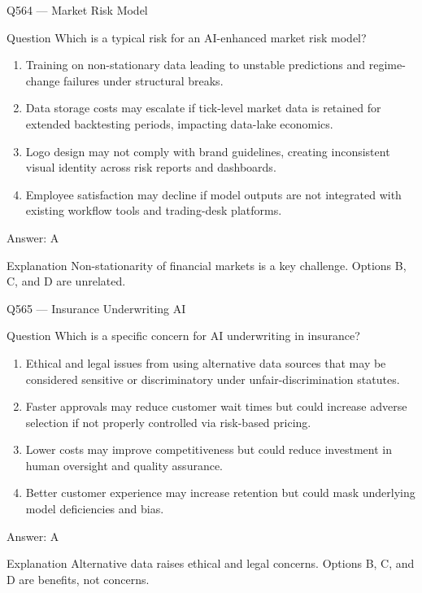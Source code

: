 \documentclass[aspectratio=169,8pt]{beamer}
\begin{document}
	\begin{frame}{Q564 --- Market Risk Model}
		\begin{block}{Question}
			Which is a typical risk for an AI-enhanced market risk model?
			\begin{enumerate}
				\item Training on non-stationary data leading to unstable predictions and regime-change failures under structural breaks.
				\item Data storage costs may escalate if tick-level market data is retained for extended backtesting periods, impacting data-lake economics.
				\item Logo design may not comply with brand guidelines, creating inconsistent visual identity across risk reports and dashboards.
				\item Employee satisfaction may decline if model outputs are not integrated with existing workflow tools and trading-desk platforms.
			\end{enumerate}
		\end{block}
		\begin{exampleblock}{Answer: A}\end{exampleblock}
		\begin{block}{Explanation}
			Non-stationarity of financial markets is a key challenge. Options B, C, and D are unrelated.
		\end{block}
	\end{frame}
	
	\begin{frame}{Q565 --- Insurance Underwriting AI}
		\begin{block}{Question}
			Which is a specific concern for AI underwriting in insurance?
			\begin{enumerate}
				\item Ethical and legal issues from using alternative data sources that may be considered sensitive or discriminatory under unfair-discrimination statutes.
				\item Faster approvals may reduce customer wait times but could increase adverse selection if not properly controlled via risk-based pricing.
				\item Lower costs may improve competitiveness but could reduce investment in human oversight and quality assurance.
				\item Better customer experience may increase retention but could mask underlying model deficiencies and bias.
			\end{enumerate}
		\end{block}
		\begin{exampleblock}{Answer: A}\end{exampleblock}
		\begin{block}{Explanation}
			Alternative data raises ethical and legal concerns. Options B, C, and D are benefits, not concerns.
		\end{block}
	\end{frame}
	
\end{document}

